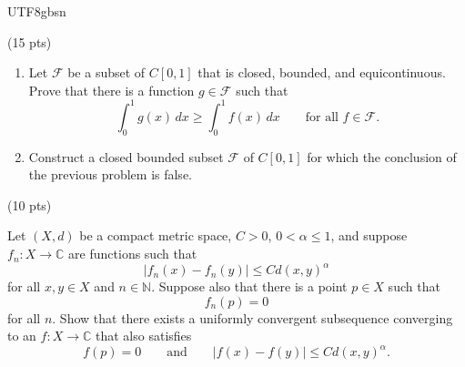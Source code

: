 \documentclass[addpoints]{exam}
\theoremstyle{definition}
\begin{document}
\begin{CJK*}{UTF8}{gbsn}
\begin{questions}
\begin{solution} 
 
 \end{solution}
 
 
\question (15 pts)
\begin{enumerate}
\item[(a)] Let \(\mathcal{F}\) be a subset of \(C[0,1]\) that is closed,
bounded, and equicontinuous. Prove that there is a function
\(g\in\mathcal{F}\) such that
\[
\int_0^1 g(x)\,dx
\ge
\int_0^1 f(x)\,dx
\qquad
\text{for all } f\in\mathcal{F}.
\]

\item[(b)] Construct a closed bounded subset \(\mathcal{F}\) of \(C[0,1]\)
for which the conclusion of the previous problem is false.
\end{enumerate}




\begin{solution} 
 
 \end{solution}



\question (10 pts)

Let \((X,d)\) be a compact metric space, \(C>0\), \(0<\alpha\le 1\), and
suppose \(f_n:X\to \mathbb{C}\) are functions such that
\[
|f_n(x)-f_n(y)|\le C d(x,y)^\alpha
\]
for all \(x,y\in X\) and \(n\in\mathbb{N}\). Suppose also that there is a point
\(p\in X\) such that
\[
f_n(p)=0
\]
for all \(n\). Show that there exists a uniformly convergent subsequence
converging to an \(f:X\to\mathbb{C}\) that also satisfies
\[
f(p)=0
\qquad\text{and}\qquad
|f(x)-f(y)|\le C d(x,y)^\alpha .
\]
   
\begin{solution} 
 
 \end{solution}

\

\end{questions}
\end{CJK*}
\end{document}
